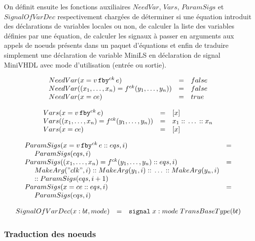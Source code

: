 \documentclass[a4paper]{article}
\newcommand{\mybox}[1]{\mbox{\tt{#1}}}
\newcommand{\ind}[0]{\hspace{0.5cm}}
\newcommand{\Cons}[0]{\; \mathbf{::} \;}
\newcommand{\Fby}[2]{#1 \, \mybox{fby}^{ck} \, #2}
\newcommand{\App}[2]{#1^{ck}(#2)}
\begin{document}
On d\'efinit ensuite les fonctions auxiliaires $NeedVar$, $Vars$, $ParamSigs$ et
$SignalOfVarDec$ respectivement charg\'ees de d\'eterminer si une \'equation introduit
des d\'eclarations de variables locales ou non, de calculer la liste des variables
d\'efinies par une \'equation, de calculer les signaux \`a passer en arguments aux
appels de noeuds pr\'esents dans un paquet d'\'equations et enfin de traduire
simplement une d\'eclaration de variable MiniLS en d\'eclaration de signal MiniVHDL
avec mode d'utilisation (entr\'ee ou sortie).

\newcommand{\NV}[1]{NeedVar(#1)}
\newcommand{\V}[1]{Vars(#1)}
\newcommand{\PS}[2]{ParamSigs(#1,#2)}
\newcommand{\SoVD}[3]{SignalOfVarDec(#1 : #2, #3)}

\[
\begin{array}{lcl}
  \NV{x = \Fby{v}{e}} & = & false \\
  \NV{(x_1,\dots,x_n) = \App{f}{y_1,\dots,y_n}} & = & false \\
  \NV{x = ce} & = & true
\end{array}
\]

\[
\begin{array}{lcl}
  \V{x = \Fby{v}{e}} & = & [x] \\
  \V{(x_1,\dots,x_n) = \App{f}{y_1,\dots,y_n}} & = & x_1 \Cons \dots \Cons x_n \\
  \V{x = ce} & = & [x]
\end{array}
\]

\[
\begin{array}{ll}
  \PS{x = \Fby{v}{e} \Cons eqs}{i} & = \\
  \ind \PS{eqs}{i} \\
  \PS{(x_1,\dots,x_n) = \App{f}{y_1,\dots,y_n} \Cons eqs}{i} & = \\
  \ind \MA{"clk"}{i} \Cons \MA{y_1}{i} \Cons \dots \Cons \MA{y_n}{i} \\
  \ind \mathtt{::} \; \PS{eqs}{i + 1}
  \\
  \PS{x = ce \Cons eqs}{i} & = \\
  \ind \PS{eqs}{i}
\end{array}
\]

\[
\begin{array}[lcl]{lcl}
  \SoVD{x}{bt}{mode} & = & \mybox{signal} \; x : mode \; TransBaseType(bt)
\end{array}
\]

\subsubsection{Traduction des noeuds}
\end{document}
